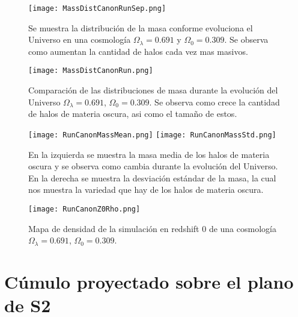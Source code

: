 \begin{figure}
    \centering
    \texttt{[image: MassDistCanonRunSep.png]}
    \caption[Distribución de masa en la evolución de un Universo $\Omega_\lambda = 0.691 $, $\Omega_0 = 0.309$]{\small Se muestra la distribución de la masa conforme evoluciona el Universo en una cosmología $\Omega_\lambda = 0.691 $ y $\Omega_0 = 0.309$. Se observa como aumentan la cantidad de halos cada vez mas masivos.}
    \label{fig:MassDistCanonRunSep}
\end{figure}

\begin{figure}
    \centering
    \texttt{[image: MassDistCanonRun.png]}
    \caption[Comparación de distribución de masa Universo $\Omega_\lambda = 0.691 $, $\Omega_0 = 0.309$]{\small Comparación de las distribuciones de masa durante la evolución del Universo $\Omega_\lambda = 0.691 $, $\Omega_0 = 0.309$. Se observa como crece la cantidad de halos de materia oscura, asi como el tamaño de estos.}
    \label{fig:MassDistCanonRun}
\end{figure}


\begin{figure}
    \centering
    \texttt{[image: RunCanonMassMean.png]}
    \texttt{[image: RunCanonMassStd.png]}
    \caption[Media y desviación estándar de la distribución de masa de un Universo $\Omega_\lambda = 0.691 $, $\Omega_0 = 0.309$]{\small En la izquierda se muestra la masa media de los halos de materia oscura y se observa como cambia durante la evolución del Universo. En la derecha se muestra la desviación estándar de la masa, la cual nos muestra la variedad que hay de los halos de materia oscura.}
    \label{fig:MassStatsCanonRun}
\end{figure}

\begin{figure}
    \centering
    \texttt{[image: RunCanonZ0Rho.png]}
    \caption[Mapa de densidad de un Universo $\Omega_\lambda = 0.691 $, $\Omega_0 = 0.309$ en z=0]{\small Mapa de densidad de la simulación en redshift 0 de una cosmología $\Omega_\lambda = 0.691 $, $\Omega_0 = 0.309$.}
    \label{fig:CanonRunDensityMap}
\end{figure}





\section{Cúmulo proyectado sobre el plano de S2}


